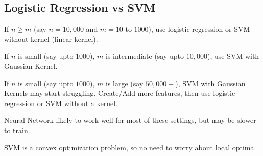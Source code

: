 \subsection{Logistic Regression vs SVM}
If $n \ge m$ (say $n = 10,000$ and $m = 10$ to $1000$), use logistic regression or SVM
without kernel (linear kernel).

If $n$ is small (say upto $1000$), $m$ is intermediate (say upto $10,000$), use SVM with
Gaussian Kernel.

If $n$ is small (say upto $1000$), $m$ is large (say $50,000+$), SVM with Gaussian Kernels
may start struggling. Create/Add more features, then use logistic regression or SVM without
a kernel.

Neural Network likely to work well for most of these settings, but may be slower to train.

SVM is a convex optimization problem, so no need to worry about local optima.

